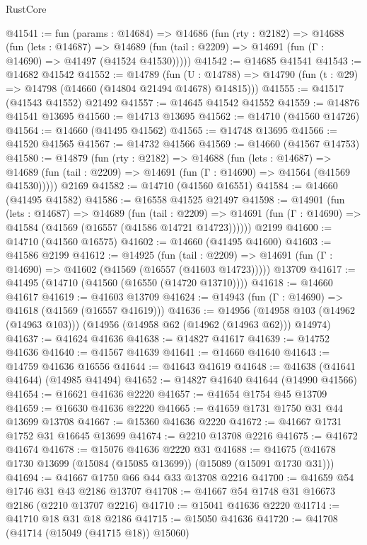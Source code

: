 \begin{lexlean}{RustCore}
\begin{coremodule}
@41541 := fun (params : @14684) =>
  @14686
    (fun (rty : @2182) =>
    @14688
      (fun (lets : @14687) =>
      @14689 (fun (tail : @2209) => @14691 (fun (Γ : @14690) => @41497 (@41524 @41530)))))
@41542 := @14685 @41541
@41543 := @14682 @41542
@41552 := @14789
    (fun (U : @14788) => @14790 (fun (t : @29) => @14798 (@14660 (@14804 @21494 @14678) @14815)))
@41555 := @41517 (@41543 @41552) @21492
@41557 := @14645 @41542 @41552
@41559 := @14876 @41541 @13695
@41560 := @14713 @13695
@41562 := @14710 (@41560 @14726)
@41564 := @14660 (@41495 @41562)
@41565 := @14748 @13695
@41566 := @41520 @41565
@41567 := @14732 @41566
@41569 := @14660 (@41567 @14753)
@41580 := @14879
    (fun (rty : @2182) =>
    @14688
      (fun (lets : @14687) =>
      @14689 (fun (tail : @2209) => @14691 (fun (Γ : @14690) => @41564 (@41569 @41530)))))
    @2169
@41582 := @14710 (@41560 @16551)
@41584 := @14660 (@41495 @41582)
@41586 := @16558 @41525 @21497
@41598 := @14901
    (fun (lets : @14687) =>
    @14689
      (fun (tail : @2209) =>
      @14691 (fun (Γ : @14690) => @41584 (@41569 (@16557 (@41586 @14721 @14723))))))
    @2199
@41600 := @14710 (@41560 @16575)
@41602 := @14660 (@41495 @41600)
@41603 := @41586 @2199
@41612 := @14925
    (fun (tail : @2209) => @14691 (fun (Γ : @14690) => @41602 (@41569 (@16557 (@41603 @14723)))))
    @13709
@41617 := @41495 (@14710 (@41560 (@16550 (@14720 @13710))))
@41618 := @14660 @41617
@41619 := @41603 @13709
@41624 := @14943 (fun (Γ : @14690) => @41618 (@41569 (@16557 @41619)))
@41636 := @14956
    (@14958 @103 (@14962 (@14963 @103)))
    (@14956 (@14958 @62 (@14962 (@14963 @62))) @14974)
@41637 := @41624 @41636
@41638 := @14827 @41617
@41639 := @14752 @41636
@41640 := @41567 @41639
@41641 := @14660 @41640
@41643 := @14759 @41636 @16556
@41644 := @41643 @41619
@41648 := @41638 (@41641 @41644) (@14985 @41494)
@41652 := @14827 @41640 @41644 (@14990 @41566)
@41654 := @16621 @41636 @2220
@41657 := @41654 @1754 @45 @13709
@41659 := @16630 @41636 @2220
@41665 := @41659 @1731 @1750 @31 @44 @13699 @13708
@41667 := @15360 @41636 @2220
@41672 := @41667 @1731 @1752 @31 @16645 @13699
@41674 := @2210 @13708 @2216
@41675 := @41672 @41674
@41678 := @15076 @41636 @2220 @31
@41688 := @41675 (@41678 @1730 @13699 (@15084 (@15085 @13699)) (@15089 (@15091 @1730 @31)))
@41694 := @41667 @1750 @66 @44 @33 @13708 @2216
@41700 := @41659 @54 @1746 @31 @43 @2186 @13707
@41708 := @41667 @54 @1748 @31 @16673 @2186 (@2210 @13707 @2216)
@41710 := @15041 @41636 @2220
@41714 := @41710 @18 @31 @18 @2186
@41715 := @15050 @41636
@41720 := @41708 (@41714 (@15049 (@41715 @18)) @15060)

\end{coremodule}
\end{lexlean}
